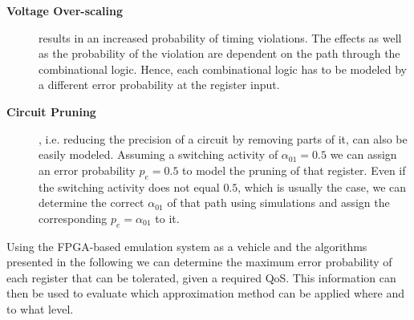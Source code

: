\documentclass[10pt,twocolumn]{IEEEtran} %
\begin{document}
\begin{description}
\item[\bf{Voltage Over-scaling}] results in an increased probability of timing violations. The effects as well as the probability of the violation are dependent on the path through the combinational logic. Hence, each combinational logic has to be modeled by a different error probability at the register input.
\item[\bf{Circuit Pruning}], i.e. reducing the precision of a circuit by removing parts of it, can also be easily modeled. Assuming a switching activity of $\alpha_{01}=0.5$ we can assign an error probability $p_e=0.5$ to model the pruning of that register. Even if the switching activity does not equal $0.5$, which is usually the case, we can determine the correct $\alpha_{01}$ of that path using simulations and assign the corresponding $p_e=\alpha_{01}$ to it.
\end{description}
Using the FPGA-based emulation system as a vehicle and the algorithms presented in the following we can determine the maximum error probability of each register that can be tolerated, given a required QoS. This information can then be used to evaluate which approximation method can be applied where and to what level.
\end{document}
